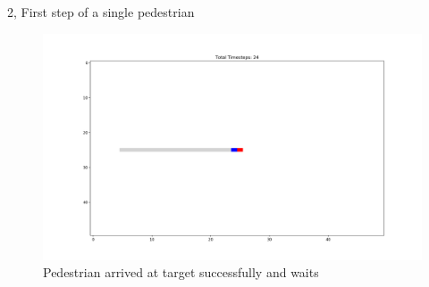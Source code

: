 \documentclass[10pt,a4paper]{article}
\begin{document}
\begin{task}{2, First step of a single pedestrian}
\begin{figure}
    \centering
    \includegraphics[width=\textwidth]{pictures/End.png}
    \caption{Pedestrian arrived at target successfully and waits}
    \label{fig:end_2}
\end{figure}
\end{task}
\end{document}
